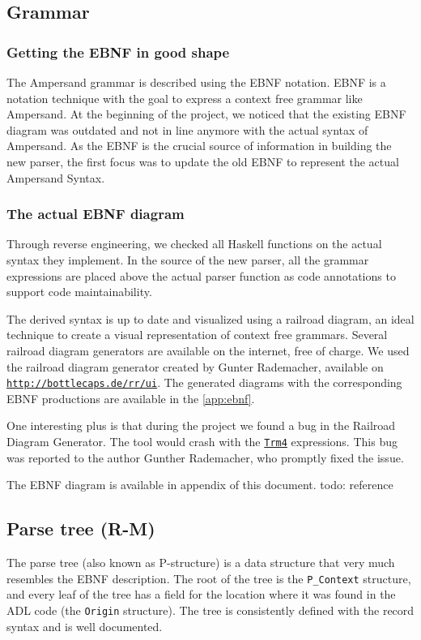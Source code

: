 \subsection{Grammar}
\label{subsec:analysis-grammar}

\subsubsection{Getting the EBNF in good shape}
%
%
The Ampersand grammar is described using the EBNF notation. 
EBNF is a notation technique with the goal to express a context free grammar like Ampersand.
At the beginning of the project, we noticed that the existing EBNF diagram was outdated and not in line anymore with the actual syntax of Ampersand.
As the EBNF is the crucial source of information in building the new parser, the first focus was to update the old EBNF to represent the actual Ampersand Syntax.

\subsubsection{The actual EBNF diagram}
Through reverse engineering, we checked all Haskell functions on the actual syntax they implement.
In the source of the new parser, all the grammar expressions are placed above the actual parser function as code annotations to support code maintainability.

The derived syntax is up to date and visualized using a railroad diagram, an ideal technique to create a visual representation of context free grammars.
Several railroad diagram generators are available on the internet, free of charge.
We used the railroad diagram generator created by Gunter Rademacher, available on \texttt{\url{http://bottlecaps.de/rr/ui}}.
The generated diagrams with the corresponding EBNF productions are available in the \autoref{app:ebnf}.

One interesting plus is that during the project we found a bug in the Railroad Diagram Generator.
The tool would crash with the \hyperref[fig:ebnf-Trm4]{\texttt{Trm4}} expressions.
This bug was reported to the author Gunther Rademacher, who promptly fixed the issue.

The EBNF diagram is available in appendix of this document. todo: reference

\subsection{Parse tree (R-M)}
\label{subsec:analysis-parse-tree}
The parse tree (also known as P-structure) is a data structure that very much resembles the EBNF description.
The root of the tree is the \texttt{P\_Context} structure, and every leaf of the tree has a field for the location where it was found in the ADL code (the \texttt{Origin} structure).
The tree is consistently defined with the record syntax and is well documented.


